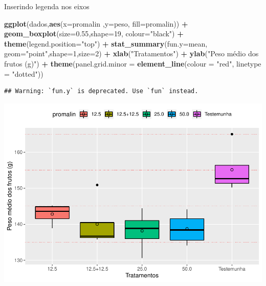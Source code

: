 \documentclass[
]{book}
\newenvironment{Shaded}{\begin{snugshade}}{\end{snugshade}}
\newcommand{\DataTypeTok}[1]{\textcolor[rgb]{0.13,0.29,0.53}{#1}}
\newcommand{\DecValTok}[1]{\textcolor[rgb]{0.00,0.00,0.81}{#1}}
\newcommand{\FloatTok}[1]{\textcolor[rgb]{0.00,0.00,0.81}{#1}}
\newcommand{\KeywordTok}[1]{\textcolor[rgb]{0.13,0.29,0.53}{\textbf{#1}}}
\newcommand{\NormalTok}[1]{#1}
\newcommand{\OperatorTok}[1]{\textcolor[rgb]{0.81,0.36,0.00}{\textbf{#1}}}
\newcommand{\StringTok}[1]{\textcolor[rgb]{0.31,0.60,0.02}{#1}}
\begin{document}
Inserindo legenda nos eixos

\begin{Shaded}
\begin{Highlighting}[]
\KeywordTok{ggplot}\NormalTok{(dados,}\KeywordTok{aes}\NormalTok{(}\DataTypeTok{x=}\NormalTok{promalin ,}\DataTypeTok{y=}\NormalTok{peso, }\DataTypeTok{fill=}\NormalTok{promalin)) }\OperatorTok{+}\StringTok{ }
\StringTok{      }\KeywordTok{geom_boxplot}\NormalTok{(}\DataTypeTok{size=}\FloatTok{0.55}\NormalTok{,}\DataTypeTok{shape=}\DecValTok{19}\NormalTok{, }\DataTypeTok{colour=}\StringTok{"black"}\NormalTok{) }\OperatorTok{+}\StringTok{ }
\StringTok{      }\KeywordTok{theme}\NormalTok{(}\DataTypeTok{legend.position=}\StringTok{"top"}\NormalTok{) }\OperatorTok{+}\StringTok{ }
\StringTok{      }\KeywordTok{stat_summary}\NormalTok{(}\DataTypeTok{fun.y=}\NormalTok{mean, }\DataTypeTok{geom=}\StringTok{"point"}\NormalTok{,}\DataTypeTok{shape=}\DecValTok{1}\NormalTok{,}\DataTypeTok{size=}\DecValTok{2}\NormalTok{) }\OperatorTok{+}\StringTok{ }
\StringTok{      }\KeywordTok{xlab}\NormalTok{(}\StringTok{"Tratamentos"}\NormalTok{) }\OperatorTok{+}\StringTok{  }
\StringTok{      }\KeywordTok{ylab}\NormalTok{(}\StringTok{"Peso médio dos frutos (g)"}\NormalTok{)  }\OperatorTok{+}
\StringTok{      }\KeywordTok{theme}\NormalTok{(}\DataTypeTok{panel.grid.minor =} \KeywordTok{element_line}\NormalTok{(}\DataTypeTok{colour =} \StringTok{"red"}\NormalTok{, }\DataTypeTok{linetype =} \StringTok{"dotted"}\NormalTok{)) }
\end{Highlighting}
\end{Shaded}

\begin{verbatim}
## Warning: `fun.y` is deprecated. Use `fun` instead.
\end{verbatim}

\includegraphics{TudodoR_files/figure-latex/unnamed-chunk-236-1.pdf}
\end{document}
